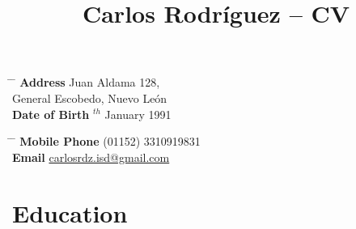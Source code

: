 \documentclass[10pt]{article} %
\begin{document}

\title{Carlos Rodríguez -- CV} %


\parbox{0.5\textwidth}{ %
\begin{tabbing} %
\hspace{3cm} \= \hspace{4cm} \= \kill %
{\bf Address} \> Juan Aldama 128,\\ %
\> General Escobedo, Nuevo León \\ %
{\bf Date of Birth} $^{th}$ January 1991 \\ %
\end{tabbing}}
\hfill %
\parbox{0.5\textwidth}{ %
\begin{tabbing} %
\hspace{3cm} \= \hspace{4cm} \= \kill %
{\bf Mobile Phone} \> (01152) 3310919831 \\ %
{\bf Email} \> \href{mailto:carlosrdz.isd@gmail.com}{carlosrdz.isd@gmail.com} \\ %
\end{tabbing}}



\section{Education}

\end{document}
